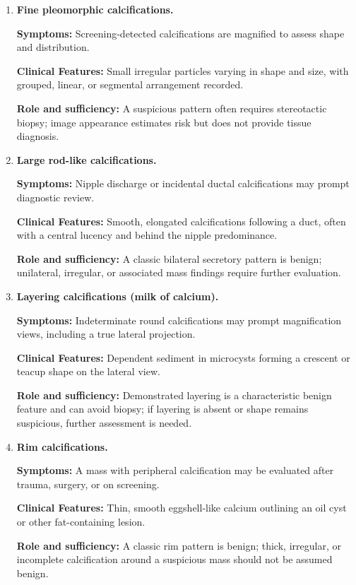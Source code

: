 \begin{enumerate}[leftmargin=*,itemsep=0.45em,topsep=0.4em]
\item \textbf{Fine pleomorphic calcifications.}\par\noindent\textbf{Symptoms:} Screening-detected calcifications are magnified to assess shape and distribution.\par\noindent\textbf{Clinical Features:} Small irregular particles varying in shape and size, with grouped, linear, or segmental arrangement recorded.\par\noindent\textbf{Role and sufficiency:} A suspicious pattern often requires stereotactic biopsy; image appearance estimates risk but does not provide tissue diagnosis.
\item \textbf{Large rod-like calcifications.}\par\noindent\textbf{Symptoms:} Nipple discharge or incidental ductal calcifications may prompt diagnostic review.\par\noindent\textbf{Clinical Features:} Smooth, elongated calcifications following a duct, often with a central lucency and behind the nipple predominance.\par\noindent\textbf{Role and sufficiency:} A classic bilateral secretory pattern is benign; unilateral, irregular, or associated mass findings require further evaluation.
\item \textbf{Layering calcifications (milk of calcium).}\par\noindent\textbf{Symptoms:} Indeterminate round calcifications may prompt magnification views, including a true lateral projection.\par\noindent\textbf{Clinical Features:} Dependent sediment in microcysts forming a crescent or teacup shape on the lateral view.\par\noindent\textbf{Role and sufficiency:} Demonstrated layering is a characteristic benign feature and can avoid biopsy; if layering is absent or shape remains suspicious, further assessment is needed.
\item \textbf{Rim calcifications.}\par\noindent\textbf{Symptoms:} A mass with peripheral calcification may be evaluated after trauma, surgery, or on screening.\par\noindent\textbf{Clinical Features:} Thin, smooth eggshell-like calcium outlining an oil cyst or other fat-containing lesion.\par\noindent\textbf{Role and sufficiency:} A classic rim pattern is benign; thick, irregular, or incomplete calcification around a suspicious mass should not be assumed benign.

\end{enumerate}
